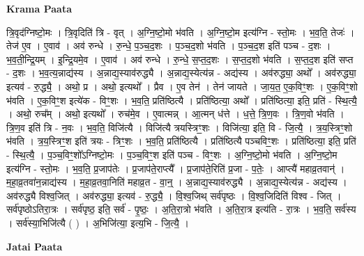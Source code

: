 \documentclass[17pt]{extarticle}
\begin{document}
\textbf{Krama Paata} \newline

त्रि॒वृद॑ग्निष्टो॒मः । त्रि॒वृदिति॑ त्रि - वृत् । अ॒ग्नि॒ष्टो॒मो भ॑वति । अ॒ग्नि॒ष्टो॒म इत्य॑ग्नि - स्तो॒मः । भ॒व॒ति॒ तेजः॑ । तेज॑ ए॒व । ए॒वाव॑ । अव॑ रुन्धे । रु॒न्धे॒ प॒ञ्च॒द॒शः । प॒ञ्च॒द॒शो भ॑वति । प॒ञ्च॒द॒श इति॑ पञ्च - द॒शः । भ॒व॒ती॒न्द्रि॒यम् । इ॒न्द्रि॒यमे॒व । ए॒वाव॑ । अव॑ रुन्धे । रु॒न्धे॒ स॒प्त॒द॒शः । स॒प्त॒द॒शो भ॑वति । स॒प्त॒द॒श इति॑ सप्त - द॒शः । भ॒व॒त्य॒न्नाद्य॑स्य । अ॒न्नाद्य॒स्याव॑रुद्ध्यै । अ॒न्नाद्य॒स्येत्य॑न्न - अद्य॑स्य । अव॑रुद्ध्या॒ अथो᳚ । अव॑रुद्ध्या॒ इत्यव॑ - रु॒द्ध्यै॒ । अथो॒ प्र । अथो॒ इत्यथो᳚ । प्रैव । ए॒व तेन॑ । तेन॑ जायते । जा॒य॒त॒ ए॒क॒विꣳ॒॒शः । ए॒क॒विꣳ॒॒शो भ॑वति । ए॒क॒विꣳ॒॒श इत्ये॑क - विꣳ॒॒शः । भ॒व॒ति॒ प्रति॑ष्ठित्यै । प्रति॑ष्ठित्या॒ अथो᳚ । प्रति॑ष्ठित्या॒ इति॒ प्रति॑ - स्थि॒त्यै॒ । अथो॒ रुच᳚म् । अथो॒ इत्यथो᳚ । रुच॑मे॒व । ए॒वात्मन्न् । आ॒त्मन् ध॑त्ते । ध॒त्ते॒ त्रि॒ण॒वः । त्रि॒ण॒वो भ॑वति । त्रि॒ण॒व इति॑ त्रि - न॒वः । भ॒व॒ति॒ विजि॑त्यै । विजि॑त्यै त्रयस्त्रिꣳ॒॒शः । विजि॑त्या॒ इति॒ वि - जि॒त्यै॒ । त्र॒य॒स्त्रिꣳ॒॒शो भ॑वति । त्र॒य॒स्त्रिꣳ॒॒श इति॑ त्रयः - त्रिꣳ॒॒शः । भ॒व॒ति॒ प्रति॑ष्ठित्यै । प्रति॑ष्ठित्यै पञ्चविꣳ॒॒शः । प्रति॑ष्ठित्या॒ इति॒ प्रति॑ - स्थि॒त्यै॒ । प॒ञ्च॒विꣳ॒॒शो᳚ऽग्निष्टो॒मः । प॒ञ्च॒विꣳ॒॒श इति॑ पञ्च - विꣳ॒॒शः । अ॒ग्नि॒ष्टो॒मो भ॑वति । अ॒ग्नि॒ष्टो॒म इत्य॑ग्नि - स्तो॒मः । भ॒व॒ति॒ प्र॒जाप॑तेः । प्र॒जाप॑ते॒राप्त्यै᳚ । प्र॒जाप॑ते॒रिति॑ प्र॒जा - प॒तेः॒ । आप्त्यै॑ महाव्र॒तवान्॑ । म॒हा॒व्र॒तवा॑न॒न्नाद्य॑स्य । म॒हा॒व्र॒तवा॒निति॑ महाव्र॒त - वा॒न्॒ । अ॒न्नाद्य॒स्याव॑रुद्ध्यै । अ॒न्नाद्य॒स्येत्य॑न्न - अद्य॑स्य । अव॑रुद्ध्यै विश्व॒जित् । अव॑रुद्ध्या॒ इत्यव॑ - रु॒द्ध्यै॒ । वि॒श्व॒जिथ् सर्व॑पृष्ठः । वि॒श्व॒जिदिति॑ विश्व - जित् । सर्व॑पृष्ठोऽतिरा॒त्रः । सर्व॑पृष्ठ॒ इति॒ सर्व॑ - पृ॒ष्ठः॒ । अ॒ति॒रा॒त्रो भ॑वति । अ॒ति॒रा॒त्र इत्य॑ति - रा॒त्रः । भ॒व॒ति॒ सर्व॑स्य । सर्व॑स्या॒भिजि॑त्यै ( ) । अ॒भिजि॑त्या॒ इत्य॒भि - जि॒त्यै॒ । \newline

\textbf{Jatai Paata} \newline
\end{document}
